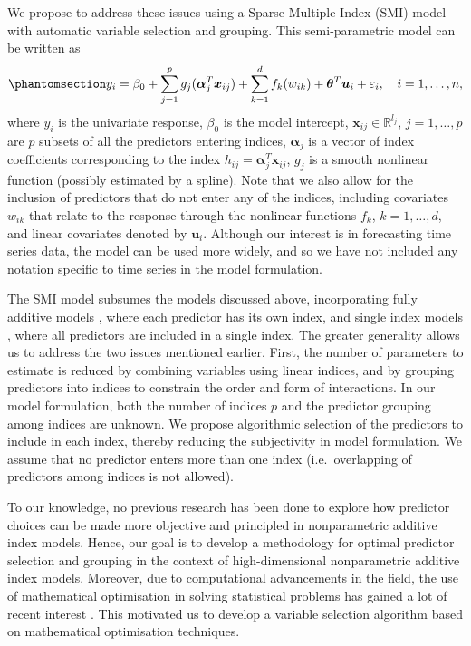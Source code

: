 \documentclass[
  11pt,
  a4paper,
]{article}
\begin{document}
We propose to address these issues using a Sparse Multiple Index (SMI)
model with automatic variable selection and grouping. This
semi-parametric model can be written as
\begin{equation}\phantomsection\label{eq-semipara}{
  y_{i} = \beta_{0} + \sum_{j = 1}^{p}g_{j}(\bm{\alpha}_{j}^{T}\bm{x}_{ij}) + \sum_{k = 1}^{d}f_{k}(w_{ik}) + \bm{\theta}^{T}\bm{u}_{i} + \varepsilon_{i}, \quad i = 1, \dots, n,
}\end{equation} where \(y_{i}\) is the univariate response,
\(\beta_{0}\) is the model intercept,
\(\bm{x}_{ij} \in \mathbb{R}^{l_{j}}\), \(j = 1, \dots, p\) are \(p\)
subsets of all the predictors entering indices, \(\bm{\alpha}_{j}\) is a
vector of index coefficients corresponding to the index
\(h_{ij} = \bm{\alpha}_{j}^{T}\bm{x}_{ij}\), \(g_{j}\) is a smooth
nonlinear function (possibly estimated by a spline). Note that we also
allow for the inclusion of predictors that do not enter any of the
indices, including covariates \(w_{ik}\) that relate to the response
through the nonlinear functions \(f_{k}\), \(k = 1, \dots, d\), and
linear covariates denoted by \(\bm{u}_{i}\). Although our interest is in
forecasting time series data, the model can be used more widely, and so
we have not included any notation specific to time series in the model
formulation.

The SMI model subsumes the models discussed above, incorporating fully
additive models \autocite{Wood2011,Wood2017}, where each predictor has
its own index, and single index models
\autocite{Stoker1986,Hardle1993,Radchenko2015}, where all predictors are
included in a single index. The greater generality allows us to address
the two issues mentioned earlier. First, the number of parameters to
estimate is reduced by combining variables using linear indices, and by
grouping predictors into indices to constrain the order and form of
interactions. In our model formulation, both the number of indices \(p\)
and the predictor grouping among indices are unknown. We propose
algorithmic selection of the predictors to include in each index,
thereby reducing the subjectivity in model formulation. We assume that
no predictor enters more than one index (i.e.~overlapping of predictors
among indices is not allowed).

To our knowledge, no previous research has been done to explore how
predictor choices can be made more objective and principled in
nonparametric additive index models. Hence, our goal is to develop a
methodology for optimal predictor selection and grouping in the context
of high-dimensional nonparametric additive index models. Moreover, due
to computational advancements in the field, the use of mathematical
optimisation in solving statistical problems has gained a lot of recent
interest \autocite{Theusl2020}. This motivated us to develop a variable
selection algorithm based on mathematical optimisation techniques.
\end{document}
